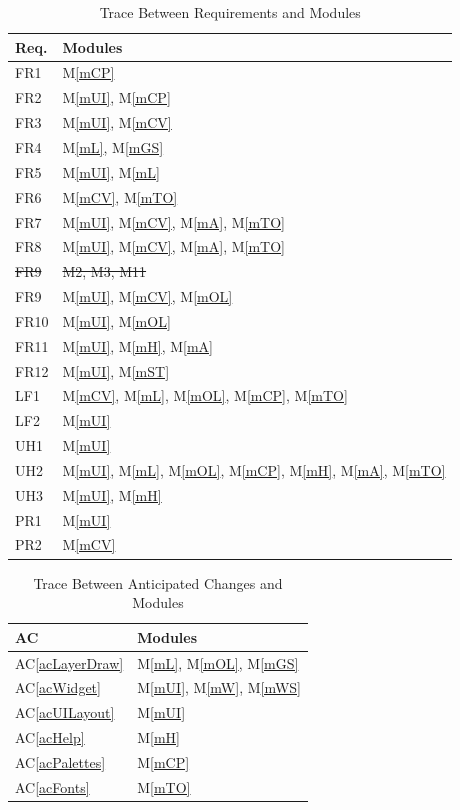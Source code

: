 \documentclass[12pt, titlepage]{article}
\newcommand{\acref}[1]{AC\ref{#1}}
\newcommand{\mref}[1]{M\ref{#1}}
\begin{document}
\begin{table}[H]
\centering
\begin{tabular}{p{} p{}}
\toprule
\textbf{Req.} & \textbf{Modules}\\
\midrule
FR1 & \mref{mCP}\\
FR2 & \mref{mUI}, \mref{mCP}\\
FR3 & \mref{mUI}, \mref{mCV}\\
FR4 & \mref{mL}, \mref{mGS}\\
FR5 & \mref{mUI}, \mref{mL}\\
FR6 & \mref{mCV}, \color{red}\mref{mTO}\\
FR7 & \mref{mUI}, \mref{mCV}, \mref{mA}, \color{red}\mref{mTO}\\
FR8 & \mref{mUI}, \mref{mCV}, \mref{mA}, \color{red}\mref{mTO}\\
\st{FR9} & \st{M2, M3, M11}\\
FR9 & \mref{mUI}, \mref{mCV}, \mref{mOL}\\
FR10 & \mref{mUI}, \mref{mOL}\\
FR11 & \mref{mUI}, \mref{mH}, \mref{mA}\\
FR12 & \mref{mUI}, \color{red}\mref{mST}\\
LF1 & \mref{mCV}, \mref{mL}, \mref{mOL}, \mref{mCP}, \color{red}\mref{mTO}\\
LF2 & \mref{mUI}\\
UH1 & \mref{mUI}\\
UH2 & \mref{mUI}, \mref{mL}, \mref{mOL}, \mref{mCP}, \mref{mH}, \mref{mA}, \color{red}\mref{mTO}\\
UH3 & \mref{mUI}, \mref{mH}\\
PR1 & \mref{mUI}\\
PR2 & \mref{mCV}\\
\bottomrule
\end{tabular}
\caption{Trace Between Requirements and Modules}
\label{TblRT}
\end{table}

\begin{table}[H]
\centering
\begin{tabular}{p{} p{}}
\toprule
\textbf{AC} & \textbf{Modules}\\
\midrule
\acref{acLayerDraw} & \mref{mL}, \mref{mOL}, \mref{mGS}\\
\acref{acWidget} & \mref{mUI}, \mref{mW}, \mref{mWS}\\
\acref{acUILayout} & \mref{mUI}\\
\acref{acHelp} & \mref{mH}\\
\acref{acPalettes} & \mref{mCP}\\
\color{red}\acref{acFonts} & \color{red}\mref{mTO}\\
\bottomrule
\end{tabular}
\caption{Trace Between Anticipated Changes and Modules}
\label{TblACT}
\end{table}
\end{document}
